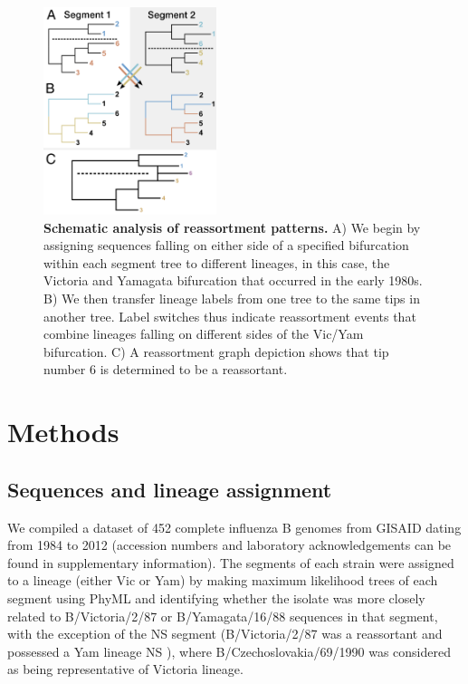 \documentclass[11pt,oneside,letterpaper]{article}
\begin{document}
\begin{figure}[h]
 \centering		
	\includegraphics[width=0.45\textwidth]{figures/TreeFigure2}
	\caption{\textbf{Schematic analysis of reassortment patterns.}
	A) We begin by assigning sequences falling on either side of a specified bifurcation within each segment tree to different lineages, in this case, the Victoria and Yamagata bifurcation that occurred in the early 1980s.
	B) We then transfer lineage labels from one tree to the same tips in another tree.
	Label switches thus indicate reassortment events that combine lineages falling on different sides of the Vic/Yam bifurcation.
	C) A reassortment graph depiction shows that tip number 6 is determined to be a reassortant.
	}
	\label{methodFig}
\end{figure}

\section*{Methods}

\subsection*{Sequences and lineage assignment}

We compiled a dataset of 452 complete influenza B genomes from GISAID \cite{GISAID} dating from 1984 to 2012 (accession numbers and laboratory acknowledgements can be found in supplementary information). 
The segments of each strain were assigned to a lineage (either Vic or Yam) by making maximum likelihood trees of each segment using PhyML \cite{guindon2003} and identifying whether the isolate was more closely related to B/Victoria/2/87 or B/Yamagata/16/88 sequences in that segment, with the exception of the NS segment (B/Victoria/2/87 was a reassortant and possessed a Yam lineage NS \cite{lindstrom1999}), where B/Czechoslovakia/69/1990 was considered as being representative of Victoria lineage.
\end{document}
